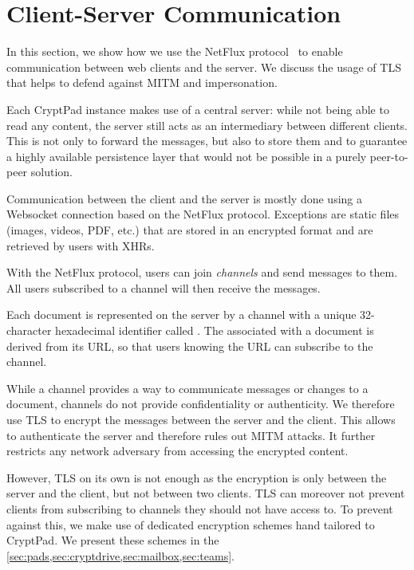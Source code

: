 \section{Client-Server Communication}
\label{sec:client_server}
In this section, we show how we use the NetFlux protocol~\cite{DeLisle2016} to enable communication between web clients and the server.
We discuss the usage of \ac{TLS} that helps to defend against \ac{MITM} and impersonation.

Each CryptPad instance makes use of a central server:
while not being able to read any content, the server still acts as an intermediary between different clients.
This is not only to forward the messages, but also to store them and to guarantee a highly available persistence layer that would not be possible in a purely peer-to-peer solution.


Communication between the client and the server is mostly done using a Websocket connection based on the NetFlux protocol.
Exceptions are static files (images, videos, PDF, etc.) that are stored in an encrypted format and are retrieved by users with \acp{XHR}.

With the NetFlux protocol, users  can join \textit{channels} and send messages to them.
All users subscribed to a channel will then receive the messages.

Each document is represented on the server by a channel with a unique 32-character hexadecimal identifier called \mychanID.
The \mychanID associated with a document is derived from its URL, so that users knowing the URL can subscribe to the channel.

While a channel provides a way to communicate messages or changes to a document, channels do not provide confidentiality or authenticity.
We therefore use \ac{TLS} to encrypt the messages between the server and the client.
This allows to authenticate the server and therefore rules out \ac{MITM} attacks.
It further restricts any network adversary from accessing the encrypted content.

However, \ac{TLS} on its own is not enough as the encryption is only between the server and the client, but not between two clients.
\ac{TLS} can moreover not prevent clients from subscribing to channels they should not have access to.
To prevent against this, we make use of dedicated encryption schemes hand tailored to CryptPad.
We present these schemes in the \cref{sec:pads,sec:cryptdrive,sec:mailbox,sec:teams}.
